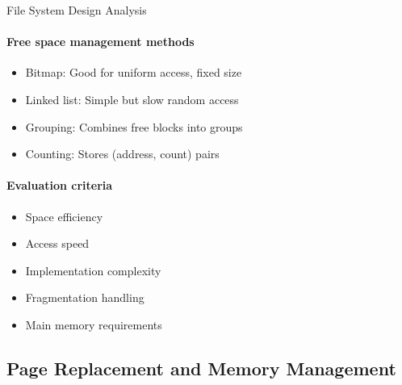 \begin{KR}{File System Design Analysis}
    \paragraph{Free space management methods}
    \begin{itemize}
        \item Bitmap: Good for uniform access, fixed size
        \item Linked list: Simple but slow random access
        \item Grouping: Combines free blocks into groups
        \item Counting: Stores (address, count) pairs
    \end{itemize}
    
    \paragraph{Evaluation criteria}
    \begin{itemize}
        \item Space efficiency
        \item Access speed
        \item Implementation complexity
        \item Fragmentation handling
        \item Main memory requirements
    \end{itemize}
\end{KR}

\subsection{Page Replacement and Memory Management}

